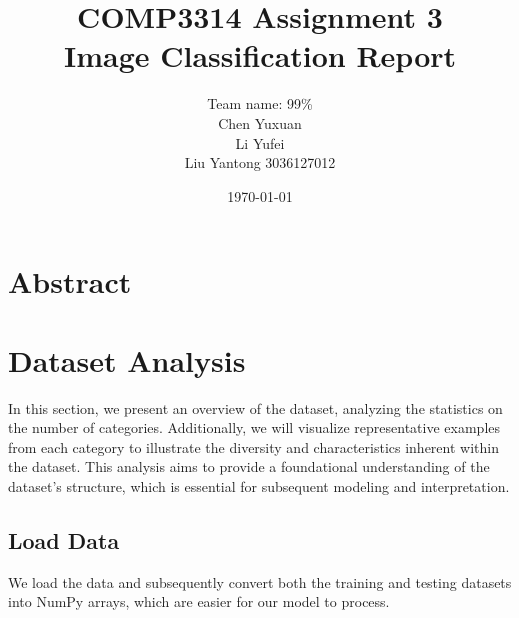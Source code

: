 \documentclass[a4paper,11pt]{article}
\begin{document}
\title{COMP3314 Assignment 3 \\ Image Classification Report}
\author{
    Team name: 99\% \\
    \vspace{0.5cm} 
    Chen Yuxuan \\
    Li Yufei \\
    Liu Yantong 3036127012
}
\date{\today}

\maketitle
\newpage
\tableofcontents\newpage
\section{Abstract}


\section{Dataset Analysis}
In this section, we present an overview of the dataset, analyzing the statistics on the number of categories. Additionally, we will visualize representative examples from each category to illustrate the diversity and characteristics inherent within the dataset. This analysis aims to provide a foundational understanding of the dataset's structure, which is essential for subsequent modeling and interpretation.

\subsection{Load Data}
We load the data and subsequently convert both the training and testing datasets into NumPy arrays, which are easier for our model to process.
\end{document}
